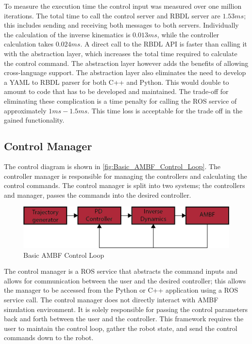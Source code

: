  To measure the execution time the control input was measured over one million iterations. The total time to call the control server and RBDL server are $1.53ms$; this includes sending and receiving both messages to both servers. Individually the calculation of the inverse kinematics is $0.013ms$, while the controller calculation takes $0.024ms$.  A direct call to the RBDL API is faster than calling it with the abstraction layer, which increases the total time required to calculate the control command. The abstraction layer however adds the benefits of allowing cross-language support. The abstraction layer also eliminates the need to develop a YAML to RBDL parser for both C++ and Python. This would double to amount to code that has to be developed and maintained. The trade-off for eliminating these complication is a time penalty for calling the ROS service of approximately $1ms-1.5ms$. This time loss is acceptable for the trade off in the gained functionality. 
 
 
 \subsection{Control Manager}
 
 The control diagram is shown in \autoref{fig:Basic_AMBF_Control_Loop}. The controller manager is responsible for managing the controllers and calculating the control commands. The control manager is split into two systems; the controllers and manager, passes the commands into the desired controller. 

\begin{figure}[h!]
    \centering
    \includegraphics[scale=1.25]{images/sim/control_outline.png}
    \caption[Basic AMBF Control Loop]{Basic AMBF Control Loop}
    \label{fig:Basic_AMBF_Control_Loop}
\end{figure}

The control manager is a ROS service that abstracts the command inputs and allows for communication between the user and the desired controller; this allows the manager to be accessed from the Python or C++ application using a ROS service call. The control manager does not directly interact with AMBF simulation environment. It is solely responsible for passing the control parameters back and forth between the user and the controller. This framework requires the user to maintain the control loop, gather the robot state, and send the control commands down to the robot. 

